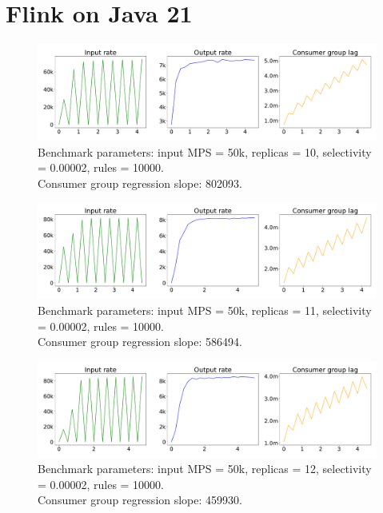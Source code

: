 \newpage

\section{Flink on Java 21}\label{sec:flink-on-java-21}

\begin{figure}[H]
    \centering
    \includegraphics[width=1\textwidth]{figures/flink-java-21-replicas-10}
    \caption{Benchmark parameters: input MPS = 50k, replicas = 10, selectivity = 0.00002, rules = 10000. \\
    Consumer group regression slope: 802093.}
    \label{fig:flink-java-21-replicas-10}
\end{figure}


\begin{figure}[H]
    \centering
    \includegraphics[width=1\textwidth]{figures/flink-java-21-replicas-11}
    \caption{Benchmark parameters: input MPS = 50k, replicas = 11, selectivity = 0.00002, rules = 10000. \\
    Consumer group regression slope: 586494.}
    \label{fig:flink-java-21-replicas-11}
\end{figure}

\begin{figure}[H]
    \centering
    \includegraphics[width=1\textwidth]{figures/flink-java-21-replicas-12}
    \caption{Benchmark parameters: input MPS = 50k, replicas = 12, selectivity = 0.00002, rules = 10000. \\
    Consumer group regression slope: 459930.}
    \label{fig:flink-java-21-replicas-12}
\end{figure}


